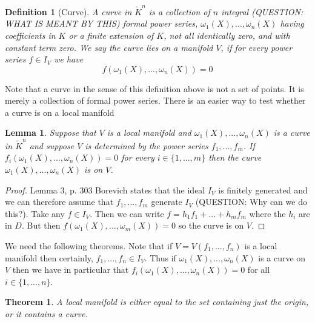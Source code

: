 \documentclass{article}
\newtheorem{theorem}{Theorem}[section]
\newtheorem{definition}{Definition}[section]
\newtheorem{lemma}{Lemma}[section]
\begin{document}


\begin{definition}[Curve]
    A curve in $\tilde{K}^n$ is a collection of $n$ integral (QUESTION: WHAT IS MEANT BY THIS) formal power series, $\omega_1(X), ..., \omega_n(X)$ having coefficients in $K$ or a finite extension of $K$, not all identically zero, and with constant term zero. We say the curve lies on a manifold $V$, if for every power series $f \in I_V$ we have $$f(\omega_1(X), ..., \omega_n(X)) = 0$$
\end{definition}
Note that a curve in the sense of this definition above is not a set of points. It is merely a collection of formal power series. There is an easier way to test whether a curve is on a local manifold
\begin{lemma}\label{lem: Curve is on manifold}
    Suppose that $V$ is a local manifold and $\omega_1(X), ..., \omega_n(X)$ is a curve in $\tilde{K}^n$ and suppose $V$ is determined by the power series $f_1, ..., f_m$. If $f_i(\omega_1(X), ..., \omega_n(X)) = 0$ for every $i \in \{1, ..., m\}$ then the curve $\omega_1(X), ..., \omega_n(X)$ is on $V$.
\end{lemma}
\begin{proof}
    Lemma 3, p. 303 Borevich states that the ideal $I_V$ is finitely generated and we can therefore assume that $f_1, ..., f_m$ generate $I_V$ (QUESTION: Why can we do this?). Take any $f \in I_V$. Then we can write $f = h_1 f_1 + ... + h_m f_m$ where the $h_i$ are in $D$. But then
    $f(\omega_1(X), ..., \omega_m(X)) = 0$ so the curve is on $V$. 
\end{proof}

We need the following theorems. Note that if $V = V(f_1, ..., f_n)$ is a local manifold then certainly, $f_1, ..., f_n \in I_V$. Thus if $\omega_1(X), ..., \omega_n(X)$ is a curve on $V$ then we have in particular that $f_i(\omega_1(X), ..., \omega_n(X)) = 0$ for all $i \in \{1, ..., n\}$. 

\begin{theorem}\label{thm: The shape of a manifold}
    A local manifold is either equal to the set containing just the origin, or it contains a curve.
\end{theorem}
\end{document}
